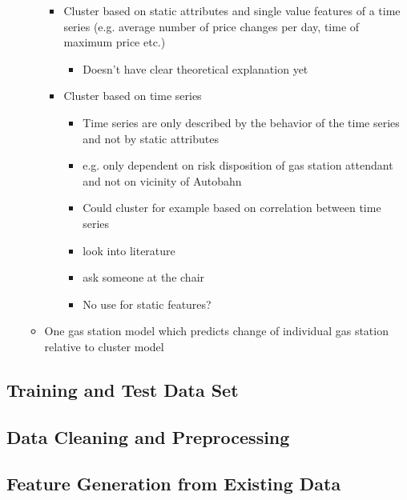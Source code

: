 \documentclass[%
a4paper,
DIV12,
2.5headlines,
bigheadings,
titlepage,
openbib,
]{scrartcl}
\begin{document}
\begin{itemize}
\begin{itemize}
\begin{itemize}
\item Cluster based on static attributes and single value features of a time series (e.g. average number of price changes per day, time of maximum price etc.)

\begin{itemize}
\item Doesn't have clear theoretical explanation yet
\end{itemize}

\item Cluster based on time series 

\begin{itemize}
\item Time series are only described by the behavior of the time series and not by static attributes
\item e.g. only dependent on risk disposition of gas station attendant and not on vicinity of Autobahn
\item Could cluster for example based on correlation between time series
\item look into literature
\item ask someone at the chair
\item No use for static features?
\end{itemize}
\end{itemize}

\item One gas station model which predicts change of individual gas station relative to cluster model
\end{itemize}
\end{itemize}



\subsection{Training and Test Data
Set}\label{training-and-test-data-set}


\subsection{Data Cleaning and
Preprocessing}\label{data-cleaning-and-preprocessing}


\subsection{Feature Generation from Existing
Data}\label{feature-generation-from-existing-data}
\end{document}
